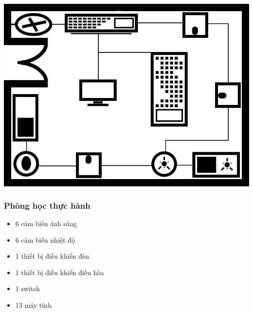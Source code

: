 \documentclass[12pt]{report}
\begin{document}
			\begin{center}
				\includegraphics[scale=0.3]{roomServer.jpg} \\
			\end{center}
		
		\newpage
		\subsubsection{Phòng học thực hành}

			\begin{itemize}
				\item 6 cảm biến ánh sáng
				\item 6 cảm biến nhiệt độ
				\item 1 thiết bị điều khiển đèn
				\item 1 thiết bị điều khiển điều hòa
				\item 1 switch
				\item 13 máy tính
			\end{itemize}
			
\end{document}

